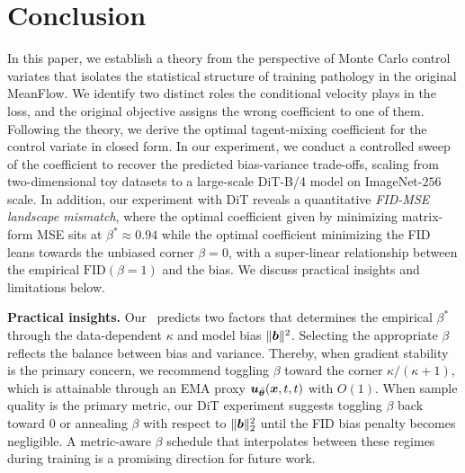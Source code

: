\section{Conclusion}
\label{sec: conclusion}

In this paper, we establish a theory from the perspective of Monte Carlo control variates that isolates the statistical structure of training pathology in the original MeanFlow. We identify two distinct roles the conditional velocity plays in the loss, and the original objective assigns the wrong coefficient to one of them. Following the theory, we derive the optimal tagent-mixing coefficient for the control variate in closed form. In our experiment, we conduct a controlled sweep of the coefficient to recover the predicted bias-variance trade-offs, scaling from two-dimensional toy datasets to a large-scale DiT-B/4 model on ImageNet-$256$ scale. In addition, our experiment with DiT reveals a quantitative \emph{FID-MSE landscape mismatch}, where the optimal coefficient given by minimizing matrix-form MSE sits at $\beta^{\ast}\!\approx\!0.94$ while the optimal coefficient minimizing the FID leans towards the unbiased corner $\beta\!=\!0$, with a super-linear relationship between the empirical $\mathrm{FID}(\beta\!=\!1)$ and the bias. We discuss practical insights and limitations below.

\noindent\textbf{Practical insights.} Our~ predicts two factors that determines the empirical $\beta^{\ast}$ through the data-dependent $\kappa$ and model bias $\|{\bm{b}}\|^{2}$. Selecting the appropriate $\beta$ reflects the balance between bias and variance. Thereby, when gradient stability is the primary concern, we recommend toggling $\beta$ toward the corner $\kappa/(\kappa{+}1)$, which is attainable through an EMA proxy ${\bm{u}}_{\bar{{\bm{\theta}}}}({\bm{x}},t,t)$ with $O(1)$. When sample quality is the primary metric, our DiT experiment suggests toggling $\beta$ back toward $0$ or annealing $\beta$ with respect to $\|{\bm{b}}\|_{2}^{2}$ until the FID bias penalty becomes negligible. A metric-aware $\beta$ schedule that interpolates between these regimes during training is a promising direction for future work.


